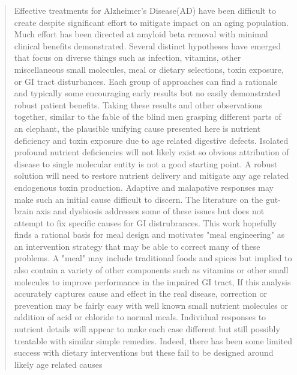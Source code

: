 \begin{abstract}
Effective treatments for Alzheimer's Disease(AD) have been difficult
to create despite significant effort to mitigate impact on 
an aging population. Much effort has been 
directed at amyloid beta removal
with minimal clinical benefits demonstrated.
Several distinct hypotheses  have  emerged that focus  
on  diverse things such as infection, vitamins,
other miscellaneous small molecules, meal or dietary selections,
  toxin exposure, or GI tract disturbances. 
 Each group of approaches can find a rationale and typically some
encouraging early results but no easily demonstrated robust 
patient benefits.  
Taking  these results and other  observations
together, similar to the fable of the blind men
grasping different parts of an elephant, the plausible unifying
cause presented here is nutrient deficiency and toxin exposure  due to 
age related digestive defects.
Isolated profound nutrient deficiencies will not likely exist
so obvious attribution of disease to single molecular entity is not
a good starting point.  
A robust solution will need to restore nutrient delivery and
mitigate any age related endogenous toxin production. 
Adaptive and malapative 
responses may make such an initial cause difficult to discern.
The literature on the gut-brain axis and dysbiosis addresses some 
of these issues
but does not attempt to fix  specific  causes for GI  distrubrances.
This work hopefully finds a rational basis for
meal design and motivates "meal engineering" as an intervention
strategy that may be able to correct many of these problems.  
A "meal" may include traditional foods and spices but implied to
also contain a variety of other components such as vitamins or
other small molecules to improve performance in the impaired GI tract, 
If this analysis accurately
captures cause and effect in the real disease, correction
or prevention may be fairly easy with well known small 
nutrient molecules or addition of acid or chloride to normal meals.
Individual responses to nutrient details will 
appear to make each case different but still possibly treatable
with similar simple remedies. 
Indeed, there has been some limited success with dietary interventions
but these fail to be designed around likely age related causes

\end{abstract}
